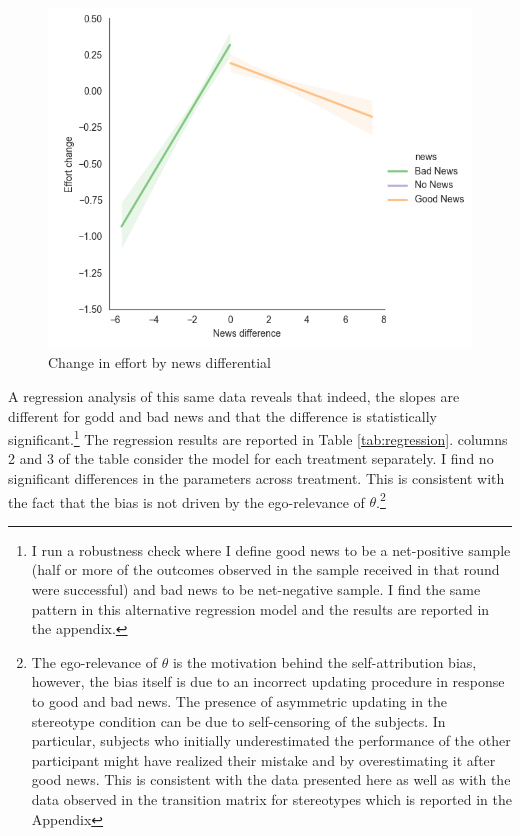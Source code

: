 \documentclass[
  12pt,
]{article}
\begin{document}
\begin{figure}
\hypertarget{fig:reaction-news}{%
\centering
\includegraphics{../figures/effort_change_news.png}
\caption{Change in effort by news differential}\label{fig:reaction-news}
}
\end{figure}

A regression analysis of this same data reveals that indeed, the slopes
are different for godd and bad news and that the difference is
statistically
significant.\footnote{I run a robustness check where I define
good news to be a net-positive sample (half or more of the outcomes observed in the sample received in that round
were successful) and bad news to be net-negative sample. I find the same pattern in this alternative regression model
and the results are reported in the appendix.} The regression results
are reported in Table \ref{tab:regression}. columns 2 and 3 of the table
consider the model for each treatment separately. I find no significant
differences in the parameters across treatment. This is consistent with
the fact that the bias is not driven by the ego-relevance of
\(\theta\).\footnote{The ego-relevance of $\theta$ is the motivation behind the self-attribution bias, 
however, the bias itself is due to an incorrect updating procedure in response to good and bad news. The presence of 
asymmetric updating in the stereotype condition can be due to self-censoring of the subjects. In particular, subjects 
who initially underestimated the performance of the other participant might have realized their mistake and 
by overestimating it after good news. This is consistent with the data presented here as well as with 
the data observed in the transition matrix for stereotypes which is reported in the Appendix}
\end{document}
